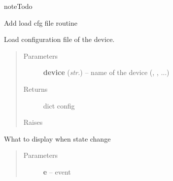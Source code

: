 \documentclass[letterpaper,10pt,english]{sphinxmanual}
\begin{document}
\begin{fulllineitems}
\begin{fulllineitems}
\begin{description}
\begin{itemize}
\end{itemize}

\end{description}

\begin{notice}{note}{Todo}

Add load cfg file routine
\end{notice}

\end{fulllineitems}


\begin{fulllineitems}
\label{enuActor.Devices:enuActor.Devices.Device.Device.load_cfg}
Load configuration file of the device.
\begin{quote}\begin{description}
\item[{Parameters}] \leavevmode
\textbf{device} (\emph{str.}) -- name of the device (, , ...)

\item[{Returns}] \leavevmode
dict config

\item[{Raises}] \leavevmode
{}

\end{description}\end{quote}

\end{fulllineitems}


\begin{fulllineitems}
\label{enuActor.Devices:enuActor.Devices.Device.Device.printstateonchange}
What to display when state change
\begin{quote}\begin{description}
\item[{Parameters}] \leavevmode
\textbf{e} -- event

\end{description}\end{quote}

\end{fulllineitems}



\end{fulllineitems}
\end{document}
